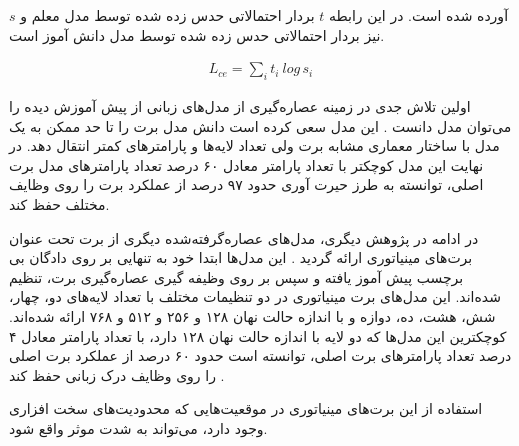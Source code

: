 آورده شده است. در این رابطه $t$ بردار احتمالاتی حدس زده شده توسط مدل معلم و $s$ نیز بردار احتمالاتی حدس زده شده توسط مدل دانش آموز است.

\begin{align} \label{eq:cross_entropy}
L_{ce} = \sum_{i}^{} t_i\:log\,s_i
\end{align}

اولین تلاش جدی در زمینه عصاره‌گیری از مدل‌های زبانی از پیش آموزش دیده را می‌توان مدل 
دانست
\cite{sanh2019distilbert}.
این مدل سعی کرده است دانش مدل برت را 
تا حد ممکن به یک مدل با ساختار معماری مشابه برت ولی تعداد  لایه‌ها و پارامتر‌های کمتر انتقال دهد. در نهایت این مدل کوچکتر با تعداد پارامتر معادل ۶۰ درصد تعداد پارامتر‌های مدل برت اصلی،
توانسته به طرز حیرت آوری حدود ۹۷ درصد از عملکرد برت را روی وظایف مختلف حفظ کند. 

در ادامه در پژوهش دیگری، مدل‌های عصاره‌گرفته‌شده دیگری از برت تحت عنوان برت‌های مینیاتوری ارائه گردید
\cite{turc2019well}.
این مدل‌ها ابتدا خود به تنهایی بر روی دادگان بی برچسب پیش آموز یافته و سپس بر روی وظیفه گیری عصاره‌گیری برت، تنظیم شده‌اند. این مدل‌های برت مینیاتوری در دو تنظیمات مختلف 
با تعداد لایه‌های دو، چهار، شش، هشت، ده، دوازه و با اندازه حالت نهان ۱۲۸ و ۲۵۶ و ۵۱۲ و ۷۶۸ ارائه شده‌اند. کوچکترین این مدل‌ها که دو لایه با اندازه حالت نهان ۱۲۸ دارد، با تعداد پارامتر معادل ۴ درصد تعداد پارامترهای برت اصلی، توانسته است حدود ۶۰ درصد از عملکرد برت‌ اصلی را روی وظایف درک زبانی حفظ کند
\cite{turc2019well}.

استفاده از این برت‌های مینیاتوری در موقعیت‌هایی که محدودیت‌های سخت افزاری وجود دارد، می‌تواند به شدت موثر واقع شود.





